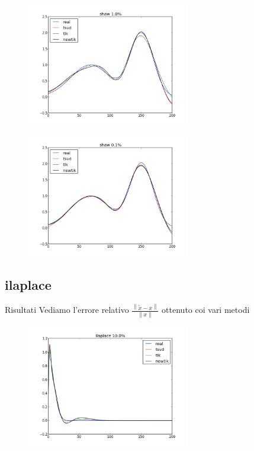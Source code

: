 \documentclass{beamer}
\theoremstyle{plain}
\theoremstyle{definition}
\theoremstyle{remark}
\newcommand{\norm}[1]{\left\|#1\right\|}
\begin{document}
\begin{frame}
  \begin{figure}
    \centering
    \includegraphics[keepaspectratio,width=270px]{shaw_10.png}
  \end{figure}
\end{frame}

\begin{frame}
  \begin{figure}
    \centering
    \includegraphics[keepaspectratio,width=270px]{shaw_1.png}
  \end{figure}
\end{frame}


\subsection{ilaplace}

\begin{frame}{Risultati}
  Vediamo l'errore relativo $\frac{\norm{\tilde x - x}}{\norm{x}}$
  ottenuto coi vari metodi
  \begin{center}
    
  \end{center}
\end{frame}

\begin{frame}
  \begin{figure}
    \centering
    \includegraphics[keepaspectratio,width=270px]{ilaplace_100.png}
  \end{figure}
\end{frame}
\end{document}

